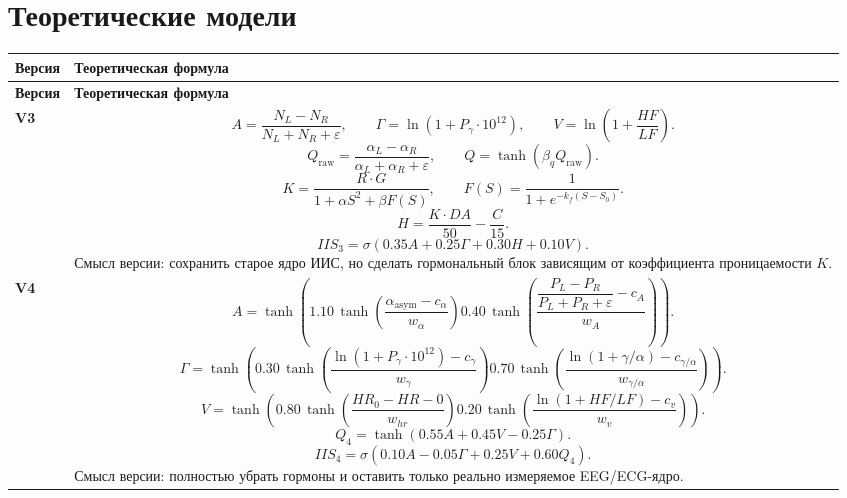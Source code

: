 \documentclass[12pt,a4paper]{article}
\newcommand{\Tnorm}[3]{\tanh\!\left(\frac{#1-#2}{#3}\right)}
\begin{document}
\section{Теоретические модели}
\begin{landscape}
\small
\begin{longtable}{>{\raggedright\arraybackslash}p{1.6cm} >{\raggedright\arraybackslash}p{16.7cm}}
\toprule
\textbf{Версия} & \textbf{Теоретическая формула} \\
\midrule
\endfirsthead
\toprule
\textbf{Версия} & \textbf{Теоретическая формула} \\
\midrule
\endhead

\textbf{V3} &
\[
A=\frac{N_L-N_R}{N_L+N_R+\varepsilon},
\qquad
\Gamma=\ln(1+P_\gamma \cdot 10^{12}),
\qquad
V=\ln\!\left(1+\frac{HF}{LF}\right).
\]
\[
Q_{\mathrm{raw}}=\frac{\alpha_L-\alpha_R}{\alpha_L+\alpha_R+\varepsilon},
\qquad
Q=\tanh(\beta_q Q_{\mathrm{raw}}).
\]
\[
K=\frac{R\cdot G}{1+\alpha S^2+\beta F(S)},
\qquad
F(S)=\frac{1}{1+e^{-k_f(S-S_0)}}.
\]
\[
H=\frac{K\cdot DA}{50}-\frac{C}{15}.
\]
\[
IIS_3=\sigma\!\left(0.35A+0.25\Gamma+0.30H+0.10V\right).
\]
Смысл версии: сохранить старое ядро ИИС, но сделать гормональный блок зависящим от коэффициента проницаемости \(K\). \\

\textbf{V4} &
\[
A=\tanh\!\left(
1.10\,\Tnorm{\alpha_{\mathrm{asym}}}{c_\alpha}{w_\alpha}
0.40\,\Tnorm{\dfrac{P_L-P_R}{P_L+P_R+\varepsilon}}{c_A}{w_A}
\right).
\]
\[
\Gamma=\tanh\!\left(
0.30\,\Tnorm{\ln(1+P_\gamma\cdot 10^{12})}{c_\gamma}{w_\gamma}
0.70\,\Tnorm{\ln(1+\gamma/\alpha)}{c_{\gamma/\alpha}}{w_{\gamma/\alpha}}
\right).
\]
\[
V=\tanh\!\left(
0.80\,\Tnorm{HR_0-HR}{0}{w_{hr}}
0.20\,\Tnorm{\ln(1+HF/LF)}{c_{v}}{w_{v}}
\right).
\]
\[
Q_4=\tanh\!\left(0.55A+0.45V-0.25\Gamma\right).
\]
\[
IIS_4=\sigma\!\left(0.10A-0.05\Gamma+0.25V+0.60Q_4\right).
\]
Смысл версии: полностью убрать гормоны и оставить только реально измеряемое EEG/ECG-ядро. \\


\end{longtable}
\end{landscape}
\end{document}
